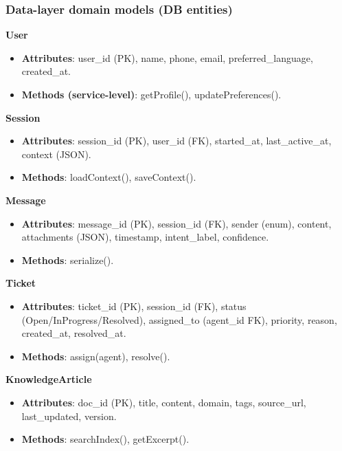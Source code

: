 \subsubsection{Data-layer domain models (DB entities)}

\textbf{User}

\begin{itemize}\setlength{\itemsep}{0pt}
\item \textbf{Attributes}: user\_id (PK), name, phone, email, preferred\_language, created\_at.
\item \textbf{Methods (service-level)}: getProfile(), updatePreferences().
\end{itemize}

\textbf{Session}

\begin{itemize}\setlength{\itemsep}{0pt}
\item \textbf{Attributes}: session\_id (PK), user\_id (FK), started\_at, last\_active\_at, context (JSON).
\item \textbf{Methods}: loadContext(), saveContext().
\end{itemize}

\textbf{Message}

\begin{itemize}\setlength{\itemsep}{0pt}
\item \textbf{Attributes}: message\_id (PK), session\_id (FK), sender (enum), content, attachments (JSON), timestamp, intent\_label, confidence.
\item \textbf{Methods}: serialize().
\end{itemize}

\textbf{Ticket}

\begin{itemize}\setlength{\itemsep}{0pt}
\item \textbf{Attributes}: ticket\_id (PK), session\_id (FK), status (Open/InProgress/Resolved), assigned\_to (agent\_id FK), priority, reason, created\_at, resolved\_at.
\item \textbf{Methods}: assign(agent), resolve().
\end{itemize}

\textbf{KnowledgeArticle}

\begin{itemize}\setlength{\itemsep}{0pt}
\item \textbf{Attributes}: doc\_id (PK), title, content, domain, tags, source\_url, last\_updated, version.
\item \textbf{Methods}: searchIndex(), getExcerpt().
\end{itemize}

